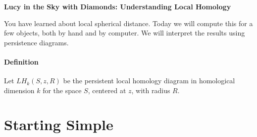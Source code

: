 \documentclass[12pt,twoside]{article}
\newcommand{\defn}{\paragraph*{Definition}}
\begin{document}
\begin{center}
{\large\textbf{Lucy in the Sky with Diamonds: Understanding Local Homology}}   
\end{center}

You have learned about local spherical distance.  Today we will compute this for a few objects, both by hand and by computer.  We will interpret the results using persistence diagrams.\\

\defn Let $LH_k(S,z,R)$ be the persistent local homology diagram in homological dimension $k$ for the space $S$, centered at $z$, with radius $R$.

\section{Starting Simple}
\end{document}
